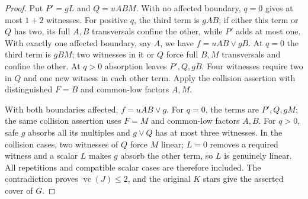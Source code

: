 \documentclass[11pt]{article}
\newcommand{\vc}{\operatorname{vc}}
\theoremstyle{definition}
\theoremstyle{remark}
\begin{document}
\begin{proof}
Put $P'=gL$ and $Q=uABM$. With no affected boundary, $q=0$ gives at most $1+2$ witnesses. For positive $q$, the third term is $gAB$; if either this term or $Q$ has two, its full $A,B$ transversals confine the other, while $P'$ adds at most one. With exactly one affected boundary, say $A$, we have $f=uAB\vee gB$. At $q=0$ the third term is $gBM$; two witnesses in it or $Q$ force full $B,M$ transversals and confine the other. At $q>0$ absorption leaves $P',Q,gB$. Four witnesses require two in $Q$ and one new witness in each other term. Apply the collision assertion with distinguished $F=B$ and common-low factors $A,M$.

With both boundaries affected, $f=uAB\vee g$. For $q=0$, the terms are $P',Q,gM$; the same collision assertion uses $F=M$ and common-low factors $A,B$. For $q>0$, safe $g$ absorbs all its multiples and $g\vee Q$ has at most three witnesses. In the collision cases, two witnesses of $Q$ force $M$ linear; $L=0$ removes a required witness and a scalar $L$ makes $g$ absorb the other term, so $L$ is genuinely linear. All repetitions and compatible scalar cases are therefore included. The contradiction proves $\vc(J)\le2$, and the original $K$ stars give the asserted cover of $G$.
\end{proof}
\end{document}
